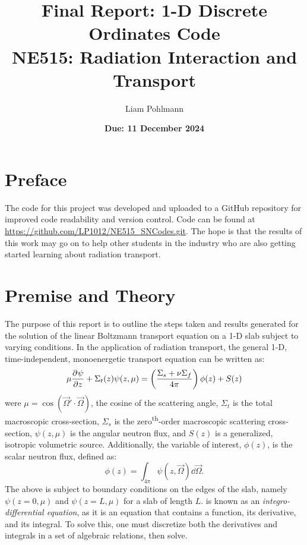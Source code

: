 \documentclass{NE515}
\title{\textbf{Final Report: 1-D Discrete Ordinates Code}\\ \vspace{1em}
NE515: Radiation Interaction and Transport}
\author[1]{Liam Pohlmann}
\affil[1]{University of New Mexico, Department of Nuclear Engineering}
\date{\textbf{Due: 11 December 2024}}
\theoremstyle{definition}
\begin{document}
    \maketitle
    \tableofcontents
    \listoffigures
    \clearpage

    \section*{Preface}
    The code for this project was developed and uploaded to a GitHub repository for improved code readability and version control.
    Code can be found at \url{https://github.com/LP1012/NE515_SNCodes.git}.
    The hope is that the results of this work may go on to help other students in the industry who are also getting started learning about radiation transport.


    \section{Premise and Theory}
    The purpose of this report is to outline the steps taken and results generated for the solution of the linear Boltzmann transport equation on a 1-D slab subject to varying conditions.
    In the application of radiation transport, the general 1-D, time-independent, monoenergetic transport equation can be written as:
    \begin{equation}
        \label{eq:1d-transport-equation}
        \mu \pdv[]{\psi }{z}( z,\mu )+\Sigma_t(z) \psi (z,\mu)=\left( \frac{\Sigma_s+\nu\Sigma_f}{4\pi} \right)\phi(z)+S(z)
    \end{equation}
    were $\mu=\cos(\vec{\Omega}'\cdot \vec{\Omega})$, the cosine of the scattering angle, $\Sigma_t$ is the total macroscopic cross-section, $\Sigma_s$ is the zero\textsuperscript{th}-order macroscopic scattering cross-section, $\psi(z,\mu)$ is the angular neutron flux, and $S(z)$ is a generalized, isotropic volumetric source.
    Additionally, the variable of interest, $\phi(z)$, is the scalar neutron flux, defined as:
    \begin{equation}
        \label{eq:phi-definition}
        \phi(z)=\int_{4\pi}^{}\psi(z,\vec{\Omega})\dd \vec{\Omega}.
    \end{equation}
    The above is subject to boundary conditions on the edges of the slab, namely $\psi(z=0,\mu)$ and $\psi(z=L,\mu)$ for a slab of length $L$.
     is known as an \textit{integro-differential equation}, as it is an equation that contains a function, its derivative, and its integral.
    To solve this, one must discretize both the derivatives and integrals in a set of algebraic relations, then solve.
\end{document}
